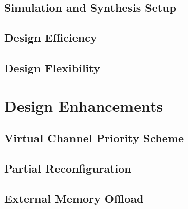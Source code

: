 \documentclass[conference,letterpaper]{IEEEtran}
\newcommand{\abovesectitle}{0pt}
\newcommand{\undersectitle}{0pt}
\renewcommand{\abovesectitle}{-4pt}
\renewcommand{\undersectitle}{-4pt}
\begin{document}
\subsection{Simulation and Synthesis Setup}
\label{sec:setup}

%
\subsection{Design Efficiency}
\vspace{-0.1cm}

%
\vspace{-0.1cm}
\subsection{Design Flexibility}
\label{sec:flex}

\vspace{-1mm}
%
%
%
%
\section{Design Enhancements}
\label{sec:disc}
\vspace{-1mm}
%
\subsection{Virtual Channel Priority Scheme}
\vspace{-1mm}

%
\subsection{Partial Reconfiguration}
\label{sec:reconfig}
\vspace{-0.1cm}

%
\vspace{-0.1cm}
\subsection{External Memory Offload}
\label{sec:ddr}
\vspace{-0.1cm}

%
%
\end{document}
